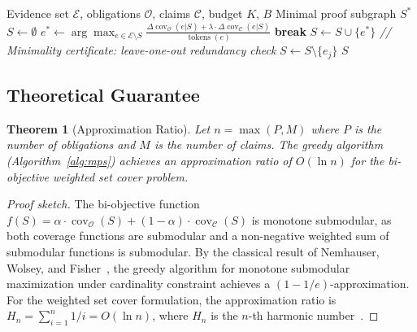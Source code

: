 \documentclass[journal,onecolumn,11pt]{IEEEtran}
\newtheorem{theorem}{Theorem}
\begin{document}
\begin{algorithm}[t]
\caption{Minimal Proof Subgraph Optimization}
\label{alg:mps}
\begin{algorithmic}[1]
\REQUIRE Evidence set $\mathcal{E}$, obligations $\mathcal{O}$, claims $\mathcal{C}$, budget $K$, $B$
\ENSURE Minimal proof subgraph $S^*$
\STATE $S \leftarrow \emptyset$
\STATE $e^* \leftarrow \arg\max_{e \in \mathcal{E} \setminus S} \frac{\Delta \operatorname{cov}_{\mathcal{O}}(e|S) + \lambda \cdot \Delta \operatorname{cov}_{\mathcal{C}}(e|S)}{\operatorname{tokens}(e)}$
\STATE \textbf{break} 
\ENDIF
\STATE $S \leftarrow S \cup \{e^*\}$
\ENDWHILE
\STATE \textit{// Minimality certificate: leave-one-out redundancy check}
\STATE $S \leftarrow S \setminus \{e_j\}$ 
\ENDIF
\ENDFOR
\RETURN $S$
\end{algorithmic}
\end{algorithm}

\subsection{Theoretical Guarantee}

\begin{theorem}[Approximation Ratio]
\label{thm:mps}
Let $n = \max(P, M)$ where $P$ is the number of obligations and $M$ is the number of claims. The greedy algorithm (Algorithm~\ref{alg:mps}) achieves an approximation ratio of $O(\ln n)$ for the bi-objective weighted set cover problem.
\end{theorem}

\begin{proof}[Proof sketch]
The bi-objective function $f(S) = \alpha \cdot \operatorname{cov}_{\mathcal{O}}(S) + (1-\alpha) \cdot \operatorname{cov}_{\mathcal{C}}(S)$ is monotone submodular, as both coverage functions are submodular and a non-negative weighted sum of submodular functions is submodular. By the classical result of Nemhauser, Wolsey, and Fisher~\cite{nemhauser1978analysis}, the greedy algorithm for monotone submodular maximization under cardinality constraint achieves a $(1 - 1/e)$-approximation. For the weighted set cover formulation, the approximation ratio is $H_n = \sum_{i=1}^n 1/i = O(\ln n)$, where $H_n$ is the $n$-th harmonic number~\cite{chvatal1979greedy}.
\end{proof}
\end{document}
